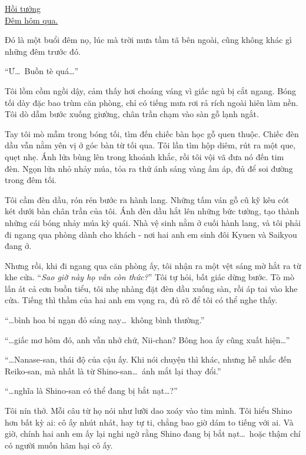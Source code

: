 \documentclass[../main.tex]{subfiles}
\begin{document}
\begin{center}
  \uline{Hồi tưởng\\Đêm hôm qua.}
\end{center}

Đó là một buổi đêm nọ, lúc mà trời mưa tầm tã bên ngoài, cũng không khác gì những đêm trước đó.

``Ư\dots\ Buồn tè quá\dots''

Tôi lồm cồm ngồi dậy, cảm thấy hơi choáng váng vì giấc ngủ bị cắt ngang. Bóng tối dày đặc bao trùm căn phòng, chỉ có tiếng mưa rơi rả rích ngoài hiên làm nền. Tôi dò dẫm bước xuống giường, chân trần chạm vào sàn gỗ lạnh ngắt.

Tay tôi mò mẫm trong bóng tối, tìm đến chiếc bàn học gỗ quen thuộc. Chiếc đèn dầu vẫn nằm yên vị ở góc bàn từ tối qua. Tôi lần tìm hộp diêm, rút ra một que, quẹt nhẹ. Ánh lửa bùng lên trong khoảnh khắc, rồi tôi vội vã đưa nó đến tim đèn. Ngọn lửa nhỏ nhảy múa, tỏa ra thứ ánh sáng vàng ấm áp, đủ để soi đường trong đêm tối.

Tôi cầm đèn dầu, rón rén bước ra hành lang. Những tấm ván gỗ cũ kỹ kêu cót két dưới bàn chân trần của tôi. Ánh đèn dầu hắt lên những bức tường, tạo thành những cái bóng nhảy múa kỳ quái. Nhà vệ sinh nằm ở cuối hành lang, và tôi phải đi ngang qua phòng dành cho khách - nơi hai anh em sinh đôi Kyuen và Saikyou đang ở.

Nhưng rồi, khi đi ngang qua căn phòng ấy, tôi nhận ra một vệt sáng mờ hắt ra từ khe cửa. ``\textit{Sao giờ này họ vẫn còn thức?}'' Tôi tự hỏi, bất giác dừng bước. Tò mò lấn át cả cơn buồn tiểu, tôi nhẹ nhàng đặt đèn dầu xuống sàn, rồi áp tai vào khe cửa. Tiếng thì thầm của hai anh em vọng ra, đủ rõ để tôi có thể nghe thấy.

``\dots bình hoa bỉ ngạn đỏ sáng nay\dots\ không bình thường.''

``\dots giấc mơ hôm đó, anh vẫn nhớ chứ, Nii-chan? Bông hoa ấy cũng xuất hiện\dots''

``\dots Nanase-san, thái độ của cậu ấy. Khi nói chuyện thì khác, nhưng hễ nhắc đến Reiko-san, mà nhất là từ Shino-san\dots\ ánh mắt lại thay đổi.''

``\dots nghĩa là Shino-san có thể đang bị bắt nạt\dots?''

Tôi nín thở. Mỗi câu từ họ nói như lưỡi dao xoáy vào tim mình. Tôi hiểu Shino hơn bất kỳ ai: cô ấy nhút nhát, hay tự ti, chẳng bao giờ dám to tiếng với ai. Và giờ, chính hai anh em ấy lại nghi ngờ rằng Shino đang bị bắt nạt\dots\ hoặc thậm chí có người muốn hãm hại cô ấy.
\end{document}
